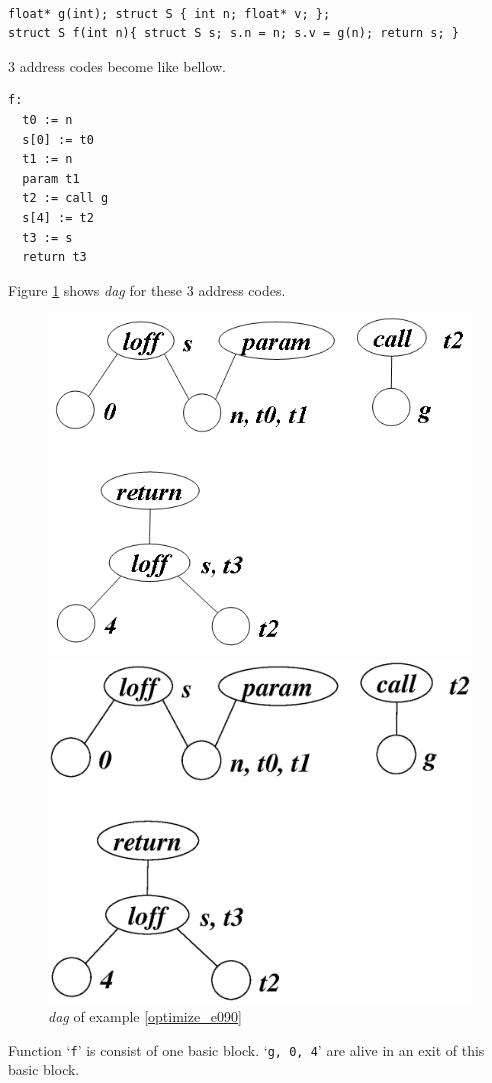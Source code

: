 \begin{Example}
\label{optimize_e091}
\begin{verbatim}

float* g(int); struct S { int n; float* v; };
struct S f(int n){ struct S s; s.n = n; s.v = g(n); return s; }
\end{verbatim}
3 address codes become like bellow.
\begin{verbatim}
f:
  t0 := n
  s[0] := t0
  t1 := n
  param t1
  t2 := call g
  s[4] := t2
  t3 := s
  return t3
\end{verbatim}
Figure \ref{optimize_e096} shows {\em dag} for these 3 address codes.
\begin{figure}[htbp]
\begin{center}
\begin{htmlonly}
\includegraphics[width=0.8\linewidth,height=0.648\linewidth]{opt039.png}
\end{htmlonly}
\begin{latexonly}
\includegraphics[width=0.8\linewidth,height=0.648\linewidth]{opt039.eps}
\end{latexonly}
\caption{{\em dag} of example \ref{optimize_e090}}
\label{optimize_e096}
\end{center}
\end{figure}
Function `{\tt{f}}' is consist of one basic block.
`{\tt{g, 0, 4}}' are
alive in an exit of this basic block.


\end{Example}
